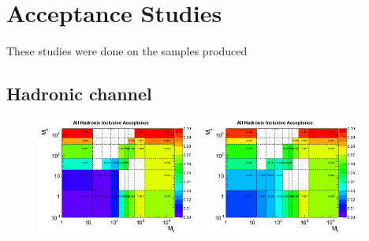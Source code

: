\section{Acceptance Studies}
\label{app:acceptance}

These studies were done on the samples produced 

\subsection{Hadronic channel}
\label{subsec:app_acc_hadronic}

\begin{figure}[htbp]
  \centering
  \includegraphics[width=0.48\textwidth]{figures/ttDM_S_allhad_2D_acc.png}
  \includegraphics[width=0.48\textwidth]{figures/ttDM_PS_allhad_2D_acc.png}
  \caption{}
  \label{fig:hadronic_acc}
\end{figure}


